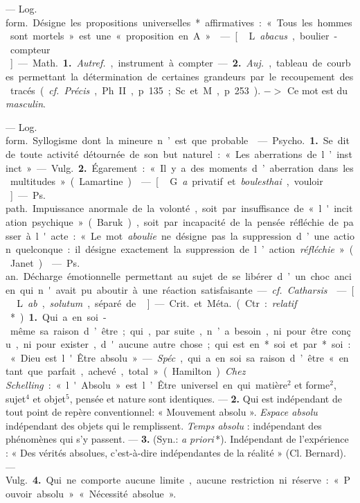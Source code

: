
	\begin{itemize}[leftmargin=1cm, label=, itemsep=1pt]

 — \si{Log. form.} Désigne les propositions universelles*
affirmatives :
« Tous les hommes sont mortels »
est une « proposition en A ».

 — [\,L. {\it abacus}, boulier-compteur\,]
— \si{Math.} {\bf 1.} {\it Autref.}, instrument
à compter. — {\bf 2.} {\it Auj.}, tableau
de courbes permettant la détermination
de certaines grandeurs par
le recoupement des tracés ({\it cf.} {\it Précis},
Ph. II, p. 135; Sc. et M., p. 253).
$->$ Ce mot est du {\it masculin}.

 — \si{Log. form.} Syllogisme
dont la mineure n’est que probable.

 — \si{Psycho.} {\bf 1.} Se dit de
toute activité détournée de son but
naturel : « Les aberrations de l’instinct ».
— \si{Vulg.} {\bf 2.} Égarement : « Il
y a des moments d’aberration dans
les multitudes » (Lamartine).

 — [\,G. {\it a}  privatif et {\it boulesthai},
vouloir\,] — \si{Ps. path.} Impuissance
anormale de la volonté, soit par
insuffisance de « l'incitation psychique »
(Baruk), soit par incapacité
de la pensée réfléchie de passer à
l'acte : « Le mot {\it aboulie} ne désigne
pas la suppression d’une action quelconque :
il désigne exactement la
suppression de l’action {\it réfléchie} »
(Janet).

 — \si{Ps. an.} Décharge émotionnelle
permettant au sujet de se
libérer d’un choc ancien qui n'avait
pu aboutir à une réaction satisfaisante.
— {\it cf.}  {\it Catharsis}.

 — [\,L. {\it ab}, {\it solutum}, séparé de\,]
— \si{Crit.} et \si{Méta.} (Ctr. : {\it relatif}\,*).
{\bf 1.} Qui a en soi-même sa raison
d’être; qui, par suite, n’a besoin, ni
pour être conçu, ni pour exister,
d'aucune autre chose; qui est en*
soi et par* soi : « Dieu est l'Être
absolu ». — {\it Spéc}., qui a en soi sa
raison d’être « en tant que parfait,
achevé, total » (Hamilton). {\it Chez
Schelling} : « l'Absolu » est l’Être
universel en qui matière$^2$ et forme$^2$,
sujet$^4$ et objet$^5$, pensée et nature
sont identiques. — {\bf 2.} Qui est indépendant
de tout point de repère
conventionnel: « Mouvement absolu ».
{\it Espace absolu} indépendant des
objets qui le remplissent. {\it Temps
absolu} : indépendant des phénomènes
qui s’y passent. — {\bf 3.} (Syn.: {\it a priori}\,*).
Indépendant de l'expérience : « Des
vérités absolues, c’est-à-dire indépendantes
de la réalité » (Cl. Bernard).
— \si{Vulg.} {\bf 4.} Qui ne comporte
aucune limite, aucune restriction
ni réserve : « Pouvoir absolu »
« Nécessité absolue ».


\end{itemize}
